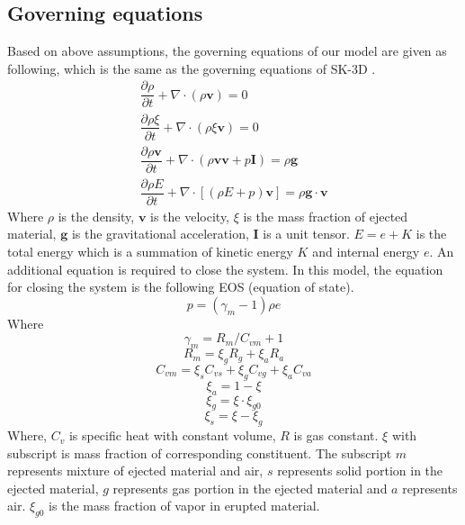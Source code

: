 \documentclass[journal abbreviation, manuscript]{copernicus}
\begin{document}
\subsection{Governing equations}
Based on above assumptions, the governing equations of our model are given as following, which is the same as the governing equations of SK-3D \citep{suzuki2005numerical}.
\begin{align}
\dfrac{\partial \rho}{\partial t} + \nabla \cdot \left(\rho \textbf{v}\right) = 0 \label{eq:gov-cs-rho} \\
\dfrac{\partial \rho \xi}{\partial t} + \nabla \cdot \left(\rho \xi \textbf{v}\right) = 0 \label{eq:gov-cs-ks}\\
\dfrac{\partial \rho \textbf{v}}{\partial t} + \nabla \cdot \left(\rho \textbf{v} \textbf{v} + p\textbf{I}\right) = \rho \textbf{g} \label{eq:gov-cs-v} \\
\dfrac{\partial \rho E}{\partial t} + \nabla \cdot \left[\left(\rho E + p \right)\textbf{v}\right] = \rho \textbf{g} \cdot\textbf{v} \label{eq:gov-cs-e}
\end{align}
Where $\rho$ is the density, $\textbf{v}$ is the velocity, $\xi$ is the mass fraction of ejected material, $\textbf{g}$ is the gravitational acceleration, $\textbf{I}$ is a unit tensor.
$E = e + K $ is the total energy which is a summation of kinetic energy $K$ and internal energy $e$.
An additional equation is required to close the system. In this model, the equation for closing the system is the following EOS (equation of state).
\begin{equation}
p = \left(\gamma_m - 1\right)\rho e \label{eq:EOS}
\end{equation}
Where 
\begin{equation}
\gamma_m = R_m/C_{vm} + 1 \label{eq:gov-gm}
\end{equation}
\begin{equation}
R_m = \xi_g R_g + \xi_a R_a  \label{eq:gov-Rm}
\end{equation}
\begin{equation}
C_{vm} = \xi_s C_{vs} + \xi_g C_{vg} + \xi_a C_{va} \label{eq:gov-Cvm}
\end{equation}
\begin{equation}
\xi_a = 1 - \xi \label{eq:gov-na}
\end{equation}
\begin{equation}
\xi_g = \xi \cdot \xi_{g0} \label{eq:gov-ng}
\end{equation}
\begin{equation}
\xi_s = \xi - \xi_g \label{eq:gov-ns}
\end{equation}
Where, $C_v$ is specific heat with constant volume, $R$ is gas constant. $\xi$ with subscript is mass fraction of corresponding constituent. The subscript 
$m$ represents mixture of ejected material and air, $s$ represents solid portion in the ejected material, $g$ represents gas portion in the ejected material and $a$ represents air. $\xi_{g0}$ is the mass fraction of vapor in erupted material.
\end{document}
